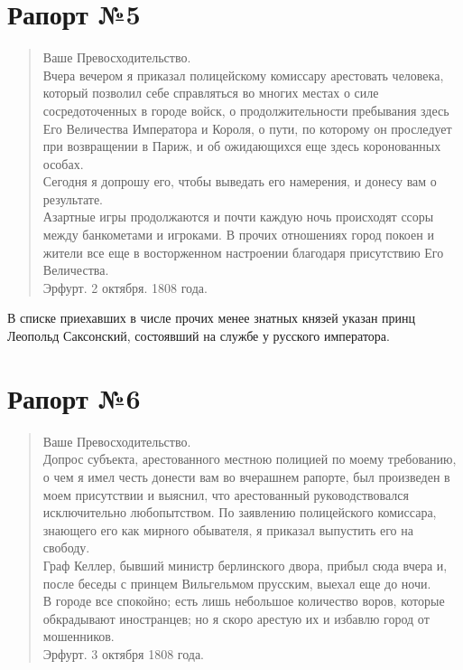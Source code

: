 \documentclass[
  oneside,
  12pt,
  titlepage]{book}
\begin{document}
\hypertarget{ux440ux430ux43fux43eux440ux442-5}{%
\section{Рапорт №5}\label{ux440ux430ux43fux43eux440ux442-5}}

\begin{quote}
Ваше Превосходительство.\\
Вчера вечером я приказал полицейскому комиссару арестовать человека, который позволил себе справляться во многих местах о силе сосредоточенных в городе войск, о продолжительности пребывания здесь Его Величества Императора и Короля, о пути, по которому он проследует при возвращении в Париж, и об ожидающихся еще здесь коронованных особах.\\
Сегодня я допрошу его, чтобы выведать его намерения, и донесу вам о результате.\\
Азартные игры продолжаются и почти каждую ночь происходят ссоры между банкометами и игроками. В прочих отношениях город покоен и жители все еще в восторженном настроении благодаря присутствию Его Величества.\\
Эрфурт. 2 октября. 1808 года.
\end{quote}

В списке приехавших в числе прочих менее знатных князей указан принц Леопольд Саксонский, состоявший на службе у русского императора.

\hypertarget{ux440ux430ux43fux43eux440ux442-6}{%
\section{Рапорт №6}\label{ux440ux430ux43fux43eux440ux442-6}}

\begin{quote}
Ваше Превосходительство.\\
Допрос субъекта, арестованного местною полицией по моему требованию, о чем я имел честь донести вам во вчерашнем рапорте, был произведен в моем присутствии и выяснил, что арестованный руководствовался исключительно любопытством. По заявлению полицейского комиссара, знающего его как мирного обывателя, я приказал выпустить его на свободу.\\
Граф Келлер, бывший министр берлинского двора, прибыл сюда вчера и, после беседы с принцем Вильгельмом прусским, выехал еще до ночи.\\
В городе все спокойно; есть лишь небольшое количество воров, которые обкрадывают иностранцев; но я скоро арестую их и избавлю город от мошенников.\\
Эрфурт. 3 октября 1808 года.
\end{quote}
\end{document}
